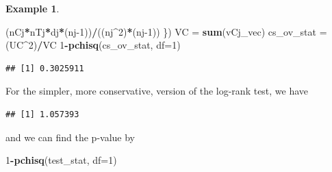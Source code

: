 \documentclass[
  openany]{book}
\newenvironment{Shaded}{\begin{snugshade}}{\end{snugshade}}
\newcommand{\AttributeTok}[1]{\textcolor[rgb]{0.13,0.29,0.53}{#1}}
\newcommand{\DecValTok}[1]{\textcolor[rgb]{0.00,0.00,0.81}{#1}}
\newcommand{\FunctionTok}[1]{\textcolor[rgb]{0.13,0.29,0.53}{\textbf{#1}}}
\newcommand{\NormalTok}[1]{#1}
\newcommand{\OtherTok}[1]{\textcolor[rgb]{0.56,0.35,0.01}{#1}}
\newcommand{\SpecialCharTok}[1]{\textcolor[rgb]{0.81,0.36,0.00}{\textbf{#1}}}
\theoremstyle{definition}
\theoremstyle{definition}
\newtheorem{example}{Example}[chapter]
\theoremstyle{definition}
\theoremstyle{definition}
\theoremstyle{remark}
\begin{document}
\begin{example}
\begin{Shaded}
\begin{Highlighting}[]
\NormalTok{    (nCj}\SpecialCharTok{*}\NormalTok{nTj}\SpecialCharTok{*}\NormalTok{dj}\SpecialCharTok{*}\NormalTok{(nj}\DecValTok{{-}1}\NormalTok{))}\SpecialCharTok{/}\NormalTok{((nj}\SpecialCharTok{\^{}}\DecValTok{2}\NormalTok{)}\SpecialCharTok{*}\NormalTok{(nj}\DecValTok{{-}1}\NormalTok{))}
\NormalTok{\})}
\NormalTok{VC }\OtherTok{=} \FunctionTok{sum}\NormalTok{(vCj\_vec)}
\NormalTok{cs\_ov\_stat }\OtherTok{=}\NormalTok{ (UC}\SpecialCharTok{\^{}}\DecValTok{2}\NormalTok{)}\SpecialCharTok{/}\NormalTok{VC}
\DecValTok{1}\SpecialCharTok{{-}}\FunctionTok{pchisq}\NormalTok{(cs\_ov\_stat, }\AttributeTok{df=}\DecValTok{1}\NormalTok{)}
\end{Highlighting}
\end{Shaded}

\begin{verbatim}
## [1] 0.3025911
\end{verbatim}

For the simpler, more conservative, version of the log-rank test, we have

\begin{Shaded}
\end{Shaded}

\begin{verbatim}
## [1] 1.057393
\end{verbatim}

and we can find the p-value by

\begin{Shaded}
\begin{Highlighting}[]
\DecValTok{1}\SpecialCharTok{{-}}\FunctionTok{pchisq}\NormalTok{(test\_stat, }\AttributeTok{df=}\DecValTok{1}\NormalTok{)}
\end{Highlighting}
\end{Shaded}


\end{example}
\end{document}
